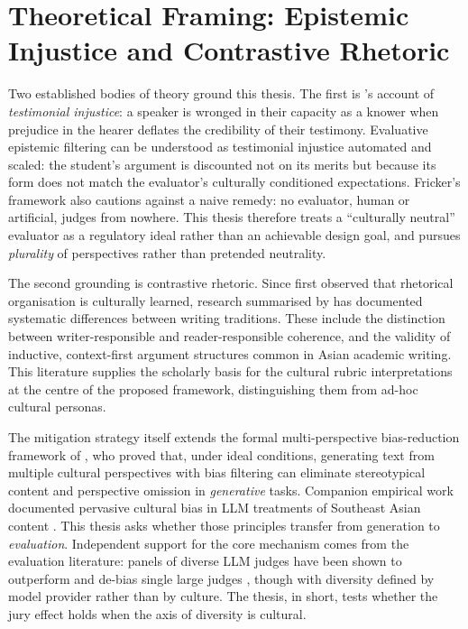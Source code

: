 \section{Theoretical Framing: Epistemic Injustice and Contrastive Rhetoric}
\label{sec:theory}

Two established bodies of theory ground this thesis. The first is
\citet{fricker2007epistemic}'s account of \emph{testimonial injustice}:
a speaker is wronged in their capacity as a knower when prejudice in
the hearer deflates the credibility of their testimony. Evaluative
epistemic filtering can be understood as testimonial injustice
automated and scaled: the student's argument is discounted not on its
merits but because its form does not match the evaluator's culturally
conditioned expectations. Fricker's framework also cautions against a
naive remedy: no evaluator, human or artificial, judges from nowhere.
This thesis therefore treats a ``culturally neutral'' evaluator as a
regulatory ideal rather than an achievable design goal, and pursues
\emph{plurality} of perspectives rather than pretended neutrality.

The second grounding is contrastive rhetoric. Since
\citet{kaplan1966cultural} first observed that rhetorical organisation
is culturally learned, research summarised by
\citet{connor2011intercultural} has documented systematic differences
between writing traditions. These include the distinction between
writer-responsible and reader-responsible coherence, and the validity of
inductive, context-first argument structures common in Asian academic
writing. This literature supplies the scholarly basis for the cultural
rubric interpretations at the centre of the proposed framework,
distinguishing them from ad-hoc cultural personas.

The mitigation strategy itself extends the formal multi-perspective
bias-reduction framework of \citet{dorleon2026uncovering}, who proved
that, under ideal conditions, generating text from multiple cultural
perspectives with bias filtering can eliminate stereotypical content
and perspective omission in \emph{generative} tasks. Companion
empirical work documented pervasive cultural bias in LLM treatments of
Southeast Asian content \citep{shujaa2026llms}. This
thesis asks whether those principles transfer from generation to
\emph{evaluation}. Independent support for the core mechanism comes
from the evaluation literature: panels of diverse LLM judges have been
shown to outperform and de-bias single large judges
\citep{verga2024replacing}, though with diversity defined by model
provider rather than by culture. The thesis, in short, tests whether
the jury effect holds when the axis of diversity is cultural.

